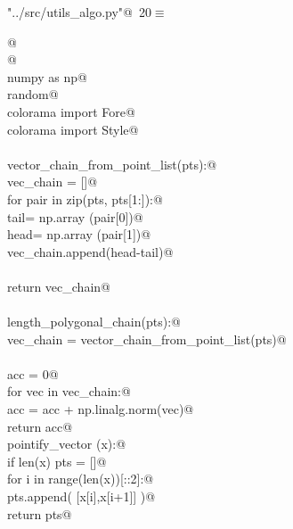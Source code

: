 \documentclass[12.0pt]{report}
\begin{document}
\begin{appendices}
\begin{flushleft} \small\label{scrap8}\raggedright\small
{} \verb@"../src/utils_algo.py"@\nobreak\ {\footnotesize {20}}$\equiv$
\vspace{-1ex}
\begin{list}{}{} \item
\mbox{}\verb@    @\\
\mbox{}\verb@ @\\
\mbox{}\verb@import numpy as np@\\
\mbox{}\verb@import random@\\
\mbox{}\verb@from colorama import Fore@\\
\mbox{}\verb@from colorama import Style@\\
\mbox{}\verb@@\\
\mbox{}\verb@def vector_chain_from_point_list(pts):@\\
\mbox{}\verb@    vec_chain = []@\\
\mbox{}\verb@    for pair in zip(pts, pts[1:]):@\\
\mbox{}\verb@        tail= np.array (pair[0])@\\
\mbox{}\verb@        head= np.array (pair[1])@\\
\mbox{}\verb@        vec_chain.append(head-tail)@\\
\mbox{}\verb@@\\
\mbox{}\verb@    return vec_chain@\\
\mbox{}\verb@@\\
\mbox{}\verb@def length_polygonal_chain(pts):@\\
\mbox{}\verb@    vec_chain = vector_chain_from_point_list(pts)@\\
\mbox{}\verb@@\\
\mbox{}\verb@    acc = 0@\\
\mbox{}\verb@    for vec in vec_chain:@\\
\mbox{}\verb@        acc = acc + np.linalg.norm(vec)@\\
\mbox{}\verb@    return acc@\\
\mbox{}\verb@def pointify_vector (x):@\\
\mbox{}\verb@    if len(x) % 2 == 0:@\\
\mbox{}\verb@        pts = []@\\
\mbox{}\verb@        for i in range(len(x))[::2]:@\\
\mbox{}\verb@            pts.append( [x[i],x[i+1]] )@\\
\mbox{}\verb@        return pts@\\

\end{list}
\end{flushleft}
\end{appendices}
\end{document}
